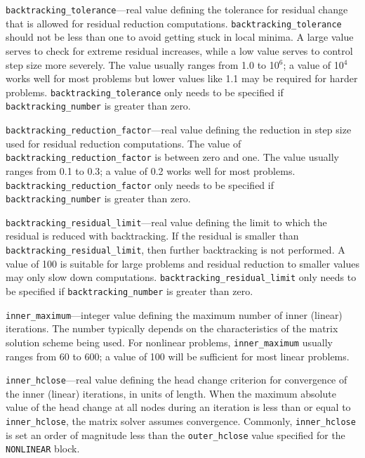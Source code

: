 \item \texttt{backtracking\_tolerance}---real value defining the tolerance for residual change that is allowed for residual reduction computations. \texttt{backtracking\_tolerance} should not be less than one to avoid getting stuck in local minima. A large value serves to check for extreme residual increases, while a low value serves to control step size more severely. The value usually ranges from 1.0 to 10$^6$; a value of 10$^4$ works well for most problems but lower values like 1.1 may be required for harder problems. \texttt{backtracking\_tolerance} only needs to be specified if \texttt{backtracking\_number} is greater than zero.

\item \texttt{backtracking\_reduction\_factor}---real value defining the reduction in step size used for residual reduction computations. The value of \texttt{backtracking\_reduction\_factor} is between zero and one. The value usually ranges from 0.1 to 0.3; a value of 0.2 works well for most problems. \texttt{backtracking\_reduction\_factor} only needs to be specified if \texttt{backtracking\_number} is greater than zero.

\item \texttt{backtracking\_residual\_limit}---real value defining the limit to which the residual is reduced with backtracking. If the residual is smaller than \texttt{backtracking\_residual\_limit}, then further backtracking is not performed. A value of 100 is suitable for large problems and residual reduction to smaller values may only slow down computations. \texttt{backtracking\_residual\_limit} only needs to be specified if \texttt{backtracking\_number} is greater than zero.

\item \texttt{inner\_maximum}---integer value defining the maximum number of inner (linear) iterations. The number typically depends on the characteristics of the matrix solution scheme being used. For nonlinear problems, \texttt{inner\_maximum} usually ranges from 60 to 600; a value of 100 will be sufficient for most linear problems.

\item \texttt{inner\_hclose}---real value defining the head change criterion for convergence of the inner (linear) iterations, in units of length. When the maximum absolute value of the head change at all nodes during an iteration is less than or equal to \texttt{inner\_hclose}, the matrix solver assumes convergence. Commonly, \texttt{inner\_hclose} is set an order of magnitude less than the \texttt{outer\_hclose} value specified for the \texttt{NONLINEAR} block.


